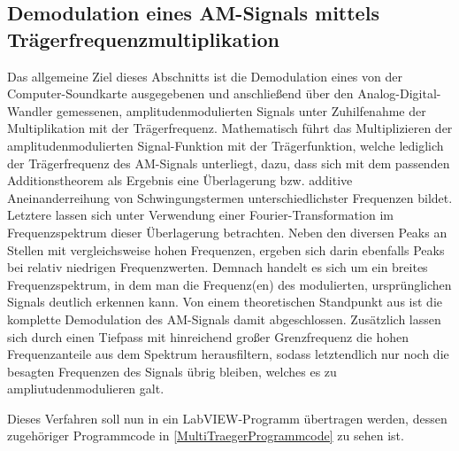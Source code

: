 \documentclass[
a4paper,
12pt,
pagesize,
ngerman
]{scrartcl}
\begin{document}
	\subsection{Demodulation eines AM-Signals mittels Trägerfrequenzmultiplikation} \label{DemodTraeger}
	
	Das allgemeine Ziel dieses Abschnitts ist die Demodulation eines von der Computer-Soundkarte ausgegebenen und anschließend über den Analog-Digital-Wandler gemessenen, amplitudenmodulierten Signals unter Zuhilfenahme der Multiplikation mit der Trägerfrequenz.
	Mathematisch führt das Multiplizieren der amplitudenmodulierten Signal-Funktion mit der Trägerfunktion, welche lediglich der Trägerfrequenz des AM-Signals unterliegt, dazu, dass sich mit dem passenden Additionstheorem als Ergebnis eine Überlagerung bzw. additive Aneinanderreihung von Schwingungstermen unterschiedlichster Frequenzen bildet.
	Letztere lassen sich unter Verwendung einer Fourier-Transformation im Frequenzspektrum dieser Überlagerung betrachten.
	Neben den diversen Peaks an Stellen mit vergleichsweise hohen Frequenzen, ergeben sich darin ebenfalls Peaks bei relativ niedrigen Frequenzwerten.
	Demnach handelt es sich um ein breites Frequenzspektrum, in dem man die Frequenz(en) des modulierten, ursprünglichen Signals deutlich erkennen kann.
	Von einem theoretischen Standpunkt aus ist die komplette Demodulation des AM-Signals damit abgeschlossen.
	Zusätzlich lassen sich durch einen Tiefpass mit hinreichend großer Grenzfrequenz die hohen Frequenzanteile aus dem Spektrum herausfiltern, sodass letztendlich nur noch die besagten Frequenzen des Signals übrig bleiben, welches es zu ampliutudenmodulieren galt. 
		
	
	Dieses Verfahren soll nun in ein LabVIEW-Programm übertragen werden, dessen zugehöriger Programmcode in \cref{MultiTraegerProgrammcode} zu sehen ist. 
	
\end{document}
